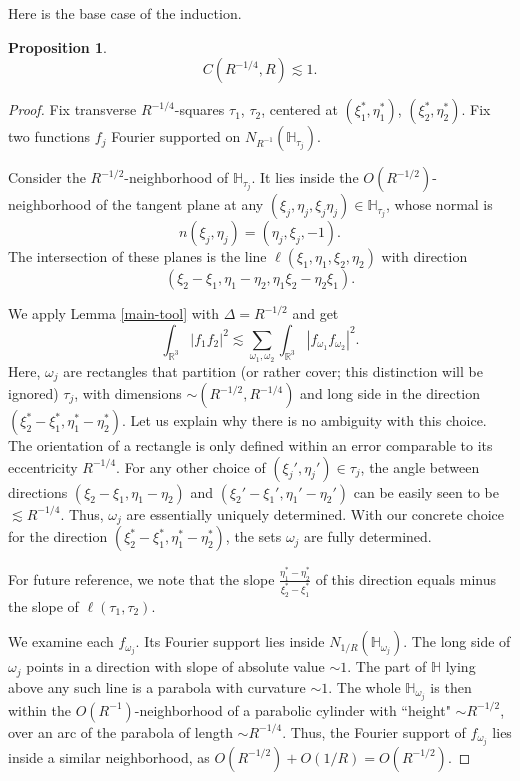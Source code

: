 \documentclass{amsart}%
\numberwithin{equation}{section}
\newtheorem{proposition}[theorem]{Proposition}
\newcommand{\ZH}{\mathbb{H}}
\newcommand{\R}{\mathbb{R}}
\newcommand{\1}{\mathbbm{1}}
\begin{document}
	Here is the base case of the induction.
	
	\begin{proposition}
		\label{jfiriurgutgur8g}	
		$$C(R^{-1/4},R)\lesssim 1.$$
	\end{proposition}
	\begin{proof}
		Fix transverse $R^{-1/4}$-squares $\tau_1$, $\tau_2$, centered at $(\xi_1^*,\eta_1^*)$, $(\xi_2^*,\eta_2^*)$.
		Fix two functions $f_j$ Fourier supported on $N_{R^{-1}}(\ZH_{\tau_j})$.
		
		Consider the $R^{-1/2}$-neighborhood of $\ZH_{\tau_j}$. It lies inside the $O(R^{-1/2})$-neighborhood of the tangent plane at any $(\xi_j,\eta_j,\xi_j\eta_j)\in\ZH_{\tau_j}$, whose normal is 
		$$n(\xi_j,\eta_j)=(\eta_j,\xi_j,-1).$$
		The intersection of these planes is the line $\ell(\xi_1,\eta_1,\xi_2,\eta_2)$
		with direction
		$$(\xi_2-\xi_1,\eta_1-\eta_2,\eta_1\xi_2-\eta_2\xi_1).$$
		
        \medskip
		
		We apply Lemma \ref{main-tool} with $\Delta=R^{-1/2}$ and get
		\begin{equation}
			\label{jjurgytg8yu869}	
			\int_{\R^3}|f_1f_2|^2\lesssim \sum_{\omega_1,\omega_2}\int_{\R^3}|f_{\omega_1}f_{\omega_2}|^2.
		\end{equation}
		Here, $\omega_j$ are rectangles that partition (or rather cover; this distinction will be ignored) $\tau_j$, with dimensions $\sim (R^{-1/2},R^{-1/4})$ and  long side in the direction $(\xi_2^*-\xi_1^*,\eta_1^*-\eta_2^*)$. Let us explain why there is no ambiguity with this choice. The orientation of a rectangle is only defined within an error comparable to its eccentricity $R^{-1/4}$.
		For any other choice of $(\xi_j',\eta_j')\in \tau_j$, the angle between directions $(\xi_2-\xi_1,\eta_1-\eta_2)$ and $(\xi_2'-\xi_1',\eta_1'-\eta_2')$ can be easily seen to be $\lesssim R^{-1/4}$. Thus,  $\omega_j$ are essentially uniquely determined.  With our concrete choice for the direction $(\xi_2^*-\xi_1^*,\eta_1^*-\eta_2^*)$, the sets $\omega_j$ are fully determined.
		
		For future reference, we note that the slope $\frac{\eta_1^*-\eta_2^*}{\xi_2^*-\xi_1^*}$ of this direction equals minus the slope of $\ell(\tau_1,\tau_2).$ 	

        \bigskip 
	
	 We examine each $f_{\omega_j}$.  Its Fourier support lies inside $N_{1/R}(\ZH_{\omega_j})$. The long side of $\omega_j$ points in a direction with slope of absolute value $\sim 1$. The part of $\ZH$ lying above any such line is a parabola with curvature $\sim 1$. The whole $\ZH_{\omega_j}$ is then within the $O(R^{-1})$-neighborhood of a parabolic cylinder with ``height" $\sim R^{-1/2}$, over an arc of the parabola of length $\sim R^{-1/4}$. Thus, the Fourier support of $f_{\omega_j}$ lies inside a similar neighborhood, as $O(R^{-1/2})+O(1/R)=O(R^{-1/2})$.
		

\end{proof}
\end{document}
